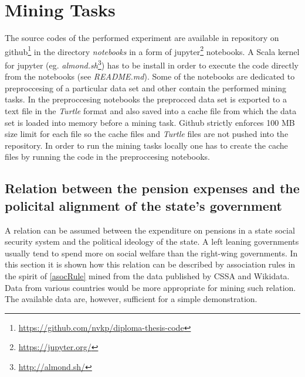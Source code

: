 \section{Mining Tasks}

The source codes of the performed experiment are available in repository on github\footnote{\href{https://github.com/nvkp/diploma-thesis-code}{https://github.com/nvkp/diploma-thesis-code}} in the directory \textit{notebooks} in a form of jupyter\footnote{\href{https://jupyter.org/}{https://jupyter.org/}} notebooks. A Scala kernel for jupyter (eg. \textit{almond.sh}\footnote{\href{http://almond.sh/}{http://almond.sh/}}) has to be install in order to execute the code directly from the notebooks (see \textit{README.md}). Some of the notebooks are dedicated to preproccesing of a particular data set and other contain the performed mining tasks. In the preproccesing notebooks the preprocced data set is exported to a text file in the \textit{Turtle} format and also saved into a cache file from which the data set is loaded into memory before a mining task.  Github strictly enforces 100 MB size limit for each file so the cache files and \textit{Turtle} files are not pushed into the repository. In order to run the mining tasks locally one has to create the cache files by running the code in the preproccesing notebooks.

\subsection{Relation between the pension expenses and the policital alignment of the state's government\label{expenses-wikidata}}

A relation can be assumed between the expenditure on pensions in a state social security system and the political ideology of the state. A left leaning governments usually tend to spend more on social welfare than the right-wing governments. In this section it is shown how this relation can be described by association rules in the spirit of \ref{asocRule} mined from the data published by CSSA and Wikidata. Data from various countries would be more appropriate for mining such relation. The available data are, however, sufficient for a simple demonstration. 

